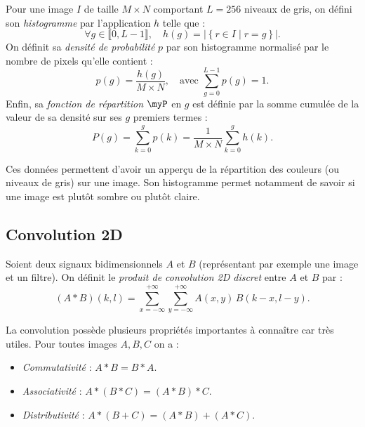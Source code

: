 \begin{definition}
    Pour une image $I$ de taille $M \times N$ comportant $L = 256$ niveaux de gris, on défini son \emph{histogramme} par l'application $h$ telle que : 
    \begin{equation}
        \forall g \in \llbracket 0, L-1 \rrbracket, \quad h(g) = \left| \left\{ r \in I \mid r = g\right\}\right|. 
    \end{equation} 
    On définit sa \emph{densité de probabilité} $p$ par son histogramme normalisé par le nombre de pixels qu'elle contient : 
    \begin{equation}
        p(g) = \frac{h(g)}{M \times N}, \quad \text{avec } \sum_{g=0}^{L-1} p(g) = 1. 
    \end{equation}
    Enfin, sa \emph{fonction de répartition} $ \myP$ en $g$ est définie par la somme cumulée de la valeur de sa densité sur ses $g$ premiers termes : 
    \begin{equation}
        P(g) = \sum_{k=0}^g p(k) = \frac{1}{M \times N} \sum_{k=0}^g h(k). 
    \end{equation}
\end{definition}

Ces données permettent d'avoir un apperçu de la répartition des couleurs (ou niveaux de gris) sur une image. Son histogramme permet notamment de savoir si une image est plutôt sombre ou plutôt claire. 

\subsection{Convolution 2D}

\begin{definition}
    Soient deux signaux bidimensionnels $A$ et $B$ (représentant par exemple une image et un filtre). On définit le \emph{produit de convolution 2D discret} entre $A$ et $B$ par : 
    \begin{equation}
        (A * B)(k,l) = \sum_{x=-\infty}^{+\infty} \sum_{y=-\infty}^{+\infty} A(x,y) \, B(k - x, l - y). 
    \end{equation}
\end{definition}

\begin{prop}
    La convolution possède plusieurs propriétés importantes à connaître car très utiles. Pour toutes images $A,B,C$ on a :
    \begin{itemize}
        \item \emph{Commutativité} : $A * B = B * A$.
        \item \emph{Associativité} : $A * (B * C) = (A * B) * C$.
        \item \emph{Distributivité} : $A * (B + C) = (A * B) + (A * C)$.
    \end{itemize}
\end{prop}

